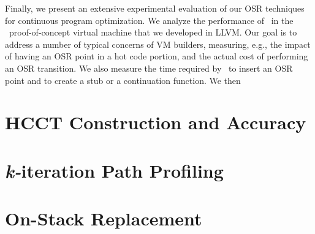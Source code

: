 Finally, we present an extensive experimental evaluation of our OSR techniques for continuous program optimization. We analyze the performance of \osrkit\ in the \tinyvm\ proof-of-concept virtual machine that we developed in LLVM. Our goal is to address a number of typical concerns of VM builders, measuring, e.g., the impact of having an OSR point in a hot code portion, and the actual cost of performing an OSR transition. We also measure the time required by \osrkit\ to insert an OSR point and to create a stub or a continuation function. We then \missing

\section{HCCT Construction and Accuracy}

\section{{\em k-}iteration Path Profiling}

\section{On-Stack Replacement}